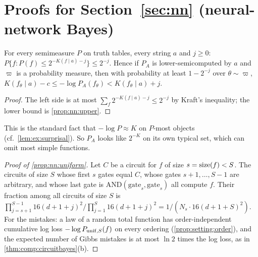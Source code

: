 \section{Proofs for Section~\ref{sec:nn} (neural-network Bayes)}\label{app:nn}

\begin{proposition}\label{prop:nn:typical}
For every semimeasure $P$ on truth tables, every string $a$ and $j\ge0$: $P\{f:P(f)\le2^{-K(f\mid a)-j}\}\le2^{-j}$. Hence if $P_A$ is lower-semicomputed by $a$ and $\varpi$ is a probability measure, then with probability at least $1-2^{-j}$ over $\theta\sim\varpi$, $K(f_\theta\mid a)-c\le-\log P_A(f_\theta)<K(f_\theta\mid a)+j$.
\end{proposition}

\begin{proof}
The left side is at most $\sum_f2^{-K(f\mid a)-j}\le2^{-j}$ by Kraft's inequality; the lower bound is \cref{prop:nn:upper}.
\end{proof}

This is the standard fact that $-\log P\approx K$ on $P$-most objects \citep{li2008introduction} (cf.\ \cref{lem:ex:surprisal}). So $P_A$ looks like $2^{-K}$ on its own typical set, which can omit most simple functions.

\begin{proof}[Proof of \cref{prop:nn:uniform}]
Let $C$ be a circuit for $f$ of size $s=\operatorname{size}(f)<S$. The circuits of size $S$ whose first $s$ gates equal $C$, whose gates $s+1,\dots,S-1$ are arbitrary, and whose last gate is $\mathrm{AND}(\mathrm{gate}_s,\mathrm{gate}_s)$ all compute $f$. Their fraction among all circuits of size $S$ is $\prod_{j=s+1}^{S-1}16(d+1+j)^2\big/\prod_{j=1}^{S}16(d+1+j)^2=1/(N_s\cdot16(d+1+S)^2)$. For the mistakes: a law of a random total function has order-independent cumulative log loss $-\log P_{{\rm unif},S}(f)$ on every ordering (\cref{prop:setting:order}), and the expected number of Gibbs mistakes is at most $\ln2$ times the log loss, as in \cref{thm:comp:circuitbayes}(b).
\end{proof}

